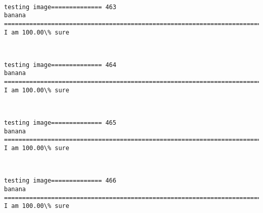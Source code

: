 \documentclass[11pt]{article}
\begin{document}
    \begin{center}
    \end{center}
    { \hspace*{\fill} \\}
    
    \begin{Verbatim}[commandchars=\\\{\}]
testing image============== 463
banana
============================================================================
I am 100.00\% sure

    \end{Verbatim}

    \begin{center}
    \end{center}
    { \hspace*{\fill} \\}
    
    \begin{Verbatim}[commandchars=\\\{\}]
testing image============== 464
banana
============================================================================
I am 100.00\% sure

    \end{Verbatim}

    \begin{center}
    \end{center}
    { \hspace*{\fill} \\}
    
    \begin{Verbatim}[commandchars=\\\{\}]
testing image============== 465
banana
============================================================================
I am 100.00\% sure

    \end{Verbatim}

    \begin{center}
    \end{center}
    { \hspace*{\fill} \\}
    
    \begin{Verbatim}[commandchars=\\\{\}]
testing image============== 466
banana
============================================================================
I am 100.00\% sure

    \end{Verbatim}
\end{document}
